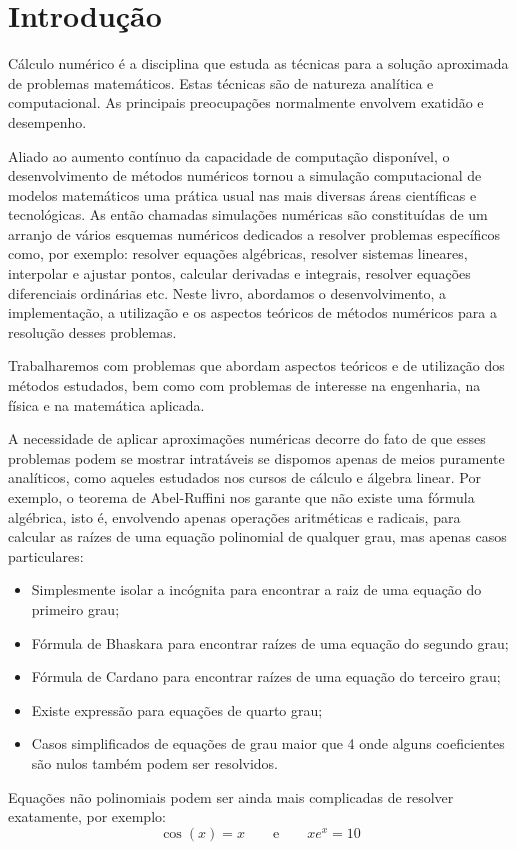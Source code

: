 
%

\chapter{Introdução}

Cálculo numérico é a disciplina que estuda as técnicas para a solução aproximada de problemas matemáticos. Estas técnicas são de natureza analítica e computacional. As principais preocupações normalmente envolvem exatidão e desempenho. 

Aliado ao aumento contínuo da capacidade de computação disponível, o desenvolvimento de métodos numéricos tornou a simulação computacional de modelos matemáticos uma prática usual nas mais diversas áreas científicas e tecnológicas. As então chamadas simulações numéricas são constituídas de um arranjo de vários esquemas numéricos dedicados a resolver problemas específicos como, por exemplo: resolver equações algébricas, resolver sistemas lineares, interpolar e ajustar pontos, calcular derivadas e integrais, resolver equações diferenciais ordinárias etc. Neste livro, abordamos o desenvolvimento, a implementação, a utilização e os aspectos teóricos de métodos numéricos para a resolução desses problemas.

Trabalharemos com problemas que abordam aspectos teóricos e de utilização dos métodos estudados, bem como com problemas de interesse na engenharia, na física e na matemática aplicada. 

A necessidade de aplicar aproximações numéricas decorre do fato de que esses problemas podem se mostrar intratáveis se dispomos apenas de meios puramente analíticos, como aqueles estudados nos cursos de cálculo e álgebra linear. Por exemplo, o teorema de Abel-Ruffini nos garante que não existe uma fórmula algébrica, isto é, envolvendo apenas operações aritméticas e radicais, para calcular as raízes de uma equação polinomial de qualquer grau, mas apenas casos particulares:
\begin{itemize}
\item Simplesmente isolar a incógnita para encontrar a raiz de uma equação do primeiro grau;
\item Fórmula de Bhaskara para encontrar raízes de uma equação do segundo grau;
\item Fórmula de Cardano para encontrar raízes de uma equação do terceiro grau;
\item Existe expressão para equações de quarto grau;
\item Casos simplificados de equações de grau maior que 4 onde alguns coeficientes são nulos também podem ser resolvidos.
\end{itemize}
Equações não polinomiais podem ser ainda mais complicadas de resolver exatamente, por exemplo:
$$
\cos(x)=x\qquad \text{e}\qquad xe^x= 10
$$

